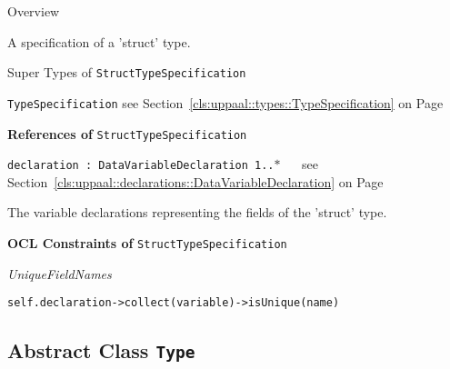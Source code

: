 	\begin{longdescription}
		\item[Overview] 		
				

	

		A specification of a 'struct' type.		
		\item[Super Types of \texttt{StructTypeSpecification}] ~
			\begin{longdescription}
				\item[\texttt{TypeSpecification}] see Section~\ref{cls:uppaal::types::TypeSpecification} on Page~\pageref{cls:uppaal::types::TypeSpecification}						\end{longdescription}
		
	
			\item[\textbf{References of} \texttt{StructTypeSpecification}] ~
			\begin{longdescription}
	\item[\texttt{declaration : DataVariableDeclaration 	\symbol{"5B}1..$*$\symbol{"5D}
}] ~
	see Section~\ref{cls:uppaal::declarations::DataVariableDeclaration} on Page~\pageref{cls:uppaal::declarations::DataVariableDeclaration}
	
	\nopagebreak
		
				

	

		The variable declarations representing the fields of the 'struct' type.		
			\end{longdescription}
			\item[\textbf{OCL Constraints of} \texttt{StructTypeSpecification}] ~
			\begin{longdescription}
	\item[\small\textit{UniqueFieldNames}] ~ 
	\nopagebreak
	
		\begin{lstlisting}[breaklines=true]
self.declaration->collect(variable)->isUnique(name)		\end{lstlisting}
			\end{longdescription}
	
	\end{longdescription}
	

\subsection{Abstract Class \bfseries \texttt{Type}\normalfont}
\label{cls:uppaal::types::Type} 
	
